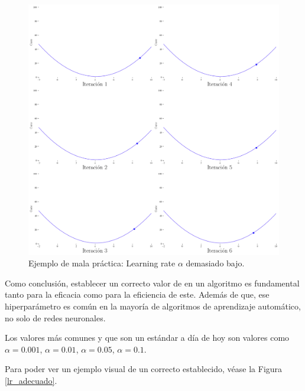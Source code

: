 \begin{figure}[H]
    \centering
    \includegraphics[scale = 0.25]{imgs/lr_bajo.png}
    \caption{Ejemplo de mala práctica: Learning rate $\alpha$ demasiado bajo.}
    \label{lr_bajo}
\end{figure}

Como conclusión, establecer un correcto valor de  en un algoritmo es fundamental tanto para la eficacia como para la eficiencia de este. Además de que, ese hiperparámetro es común en la mayoría de algoritmos de aprendizaje automático, no solo de redes neuronales.

Los valores más comunes y que son un estándar a día de hoy son valores como $\alpha = 0.001$, $\alpha = 0.01$, $\alpha = 0.05$, $\alpha = 0.1$.

Para poder ver un ejemplo visual de un  correcto  establecido, véase la Figura \ref{lr_adecuado}.

